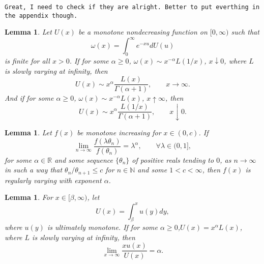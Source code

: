 \documentclass[12pt,a4paper]{amsart}
\numberwithin{equation}{section}
\theoremstyle{plain}
\newtheorem{lem}[thm]{Lemma}
\theoremstyle{definition}
\theoremstyle{remark}
\begin{document}
{\tt Great, I need to check if they are alright. Better to put everthing in the appendix though.}
\begin{lem}\label{lem: tau}
Let $U(x)$ be a monotone nondecreasing function on $[0,\infty)$ such that
\[
\omega(x)=\int_0^\infty e^{-xu} dU(u)
\]
is finite for all $x>0$. If for some $\alpha\geq 0$, $\omega(x)\sim x^{-\alpha}L(1/x)$, $x\downarrow 0$, where $L$ is slowly varying at infinity, then
\[
U(x)\sim x^{\alpha}\dfrac{L(x)}{\Gamma(\alpha+1)},\qquad x\to\infty.
\]
 And if for some $\alpha\geq 0$, $\omega(x)\sim x^{-\alpha}L(x)$, $x\uparrow \infty$, then
\[
U(x)\sim x^{\alpha}\dfrac{L(1/x)}{\Gamma(\alpha+1)},\qquad x\downarrow 0.
\]
\end{lem}
\begin{lem}\label{lem:regu}
Let $f(x)$ be monotone increasing for $x\in (0,c)$. If
\[
\lim_{n\to\infty}\dfrac{f(\lambda\theta_n)}{f(\theta_n)}=\lambda^\alpha,\qquad \forall \lambda\in (0,1],
\]
for some $\alpha\in\mathbb R$ and some sequence $\{\theta_n\}$ of positive reals tending to $0$, as $n\to\infty$ in such a way that $\theta_n/\theta_{n+1}\leq c$ for $n\in\mathbb N$ and some $1<c<\infty$, then $f(x)$ is regularly varying with exponent $\alpha$.
\end{lem}
\begin{lem}\label{lem:tail}
For $x\in [\beta,\infty)$, let
\[
U(x)=\int_\beta^xu(y)dy,
\]
where $u(y)$ is ultimately monotone.  If for some $\alpha\geq 0$,$U(x)=x^\alpha L(x)$,  where $L$ is slowly varying at infinity, then
\[
\lim_{x\to\infty}\dfrac{xu(x)}{U(x)}=\alpha.
\]
\end{lem}
\end{document}
